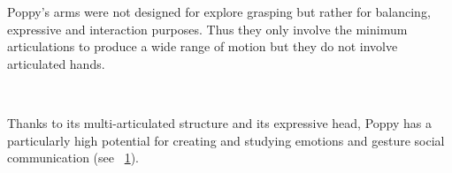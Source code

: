 Poppy's arms were not designed for explore grasping but rather for balancing, expressive and interaction purposes. Thus they only involve the minimum articulations to produce a wide range of motion but they do not involve articulated hands.

\begin{figure}[tb]
\centering
    \hfil
    \\
    \hfil
    \caption{}
    \label{fig:TER_cognitic}
\end{figure}

Thanks to its multi-articulated structure and its expressive head, Poppy has a particularly high potential for creating and studying emotions and gesture social communication (see \figurename~\ref{fig:TER_cognitic}).






